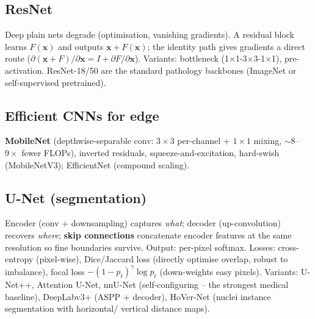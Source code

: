 \subsection{ResNet}
Deep plain nets degrade (optimisation, vanishing gradients). A residual block learns $F(\mathbf{x})$ and outputs
$\mathbf{x}+F(\mathbf{x})$; the identity path gives gradients a direct route ($\partial(\mathbf{x}+F)/\partial\mathbf{x}=I+\partial F/\partial \mathbf{x}$).
Variants: bottleneck (1$\times$1-3$\times$3-1$\times$1), pre-activation. ResNet-18/50 are the standard pathology
backbones (ImageNet or self-supervised pretrained).

\subsection{Efficient CNNs for edge}
\textbf{MobileNet} (depthwise-separable conv: $3\times3$ per-channel + $1\times1$ mixing, $\sim 8$--$9\times$ fewer FLOPs),
inverted residuals, squeeze-and-excitation, hard-swish (MobileNetV3); EfficientNet (compound scaling).

\subsection{U-Net (segmentation)}
Encoder (conv + downsampling) captures \emph{what}; decoder (up-convolution) recovers \emph{where}; \textbf{skip
connections} concatenate encoder features at the same resolution so fine boundaries survive. Output: per-pixel softmax.
Losses: cross-entropy (pixel-wise), Dice/Jaccard loss (directly optimise overlap, robust to imbalance), focal loss
$-(1-p_t)^\gamma\log p_t$ (down-weights easy pixels). Variants: U-Net++, Attention U-Net, nnU-Net (self-configuring --
the strongest medical baseline), DeepLabv3+ (ASPP + decoder), HoVer-Net (nuclei instance segmentation with horizontal/
vertical distance maps).

